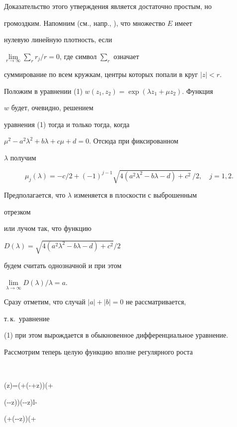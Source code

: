  


Доказательство этого утверждения является достаточно простым, но 


громоздким. Напомним (см., напр., \cite{4}), что множество $E$ имеет 


нулевую линейную плотность, если 


$\lim\limits_{r\to\infty}\sum_r{}r_j/r=0$, где символ $\sum_r$ означает 


суммирование по всем кружкам, центры которых попали в круг $|z|<r$. 


 


Положим в уравнении (1) $w(z_1,z_2)=\exp(\lambda z_1+\mu z_2)$. Функция 


$w$ будет, очевидно, решением 


уравнения (1) тогда и только тогда, когда 


$\mu^2-a^2\lambda^2+b\lambda+c\mu+d=0$. Отсюда при фиксированном 


$\lambda$ получим 


$$ 


\mu_j(\lambda)=-c/2+(-1)^{j-1} 


\sqrt{4(a^2\lambda^2-b\lambda-d)+c^2}\,/2,\quad j=1,2. 


$$ 


Предполагается, что $\lambda$ изменяется в плоскости с выброшенным 


отрезком 


или лучом так, что функцию 


$D(\lambda){=}\sqrt{4(a^2\lambda^2{-}b\lambda{-}d){+}c^2}/2$


будем считать однозначной и при этом 


$\lim\limits_{\lambda\to\infty}D(\lambda)/\lambda{=}a$. 


Сразу отметим, что случай $|a|+|b|=0$ не рассматривается, 


т.\,к.~уравнение 


(1) при этом вырождается в обыкновенное дифференциальное уравнение. 


 


Рассмотрим теперь целую функцию вполне регулярного роста 


$$ 


\Delta(z)=(\alpha+\beta(-+z))(\gamma+\delta 


(--z))\exp(--z)l- 


(\alpha+\beta(--z))(\gamma+\delta 


